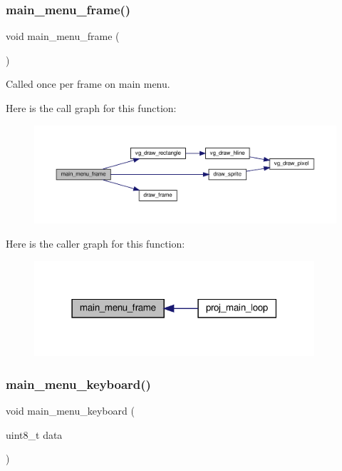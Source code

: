 \subsubsection{\texorpdfstring{main\+\_\+menu\+\_\+frame()}{main\_menu\_frame()}}
{\footnotesize\ttfamily void main\+\_\+menu\+\_\+frame (\begin{DoxyParamCaption}{ }\end{DoxyParamCaption})}



Called once per frame on main menu. 

Here is the call graph for this function\+:\nopagebreak
\begin{figure}[H]
\begin{center}
\leavevmode
\includegraphics[width=350pt]{group__Main-Menu_gab084ce5f50d30f5b66396d4afa61f3a0_cgraph}
\end{center}
\end{figure}
Here is the caller graph for this function\+:\nopagebreak
\begin{figure}[H]
\begin{center}
\leavevmode
\includegraphics[width=295pt]{group__Main-Menu_gab084ce5f50d30f5b66396d4afa61f3a0_icgraph}
\end{center}
\end{figure}
\mbox{\label{group__Main-Menu_gaa455d5f53d6465e1e8c467bbc1231f47}} 
\subsubsection{\texorpdfstring{main\+\_\+menu\+\_\+keyboard()}{main\_menu\_keyboard()}}
{\footnotesize\ttfamily void main\+\_\+menu\+\_\+keyboard (\begin{DoxyParamCaption}\item[{uint8\+\_\+t}]{data }\end{DoxyParamCaption})}




